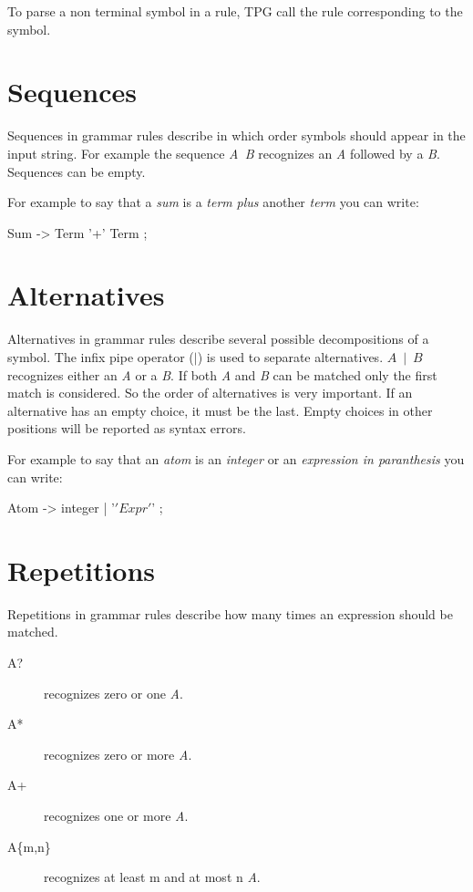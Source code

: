 To parse a non terminal symbol in a rule, TPG call the rule corresponding to the symbol.

\section{Sequences}                                             \label{parser:sequences}

Sequences in grammar rules describe in which order symbols should appear in the input string.
For example the sequence \emph{A~B} recognizes an \emph{A} followed by a \emph{B}.
Sequences can be empty.

For example to say that a \emph{sum} is a \emph{term} \emph{plus} another \emph{term} you can write:
\begin{verbatimtab}[4]
    Sum -> Term '+' Term ;
\end{verbatimtab}

\section{Alternatives}                                          \label{parser:alternatives}

Alternatives in grammar rules describe several possible decompositions of a symbol.
The infix pipe operator (\emph{$\mid$}) is used to separate alternatives.
\emph{$A~\mid~B$} recognizes either an \emph{A} or a \emph{B}.
If both \emph{A} and \emph{B} can be matched only the first match is considered.
So the order of alternatives is very important.
If an alternative has an empty choice, it must be the last.
Empty choices in other positions will be reported as syntax errors.

For example to say that an \emph{atom} is an \emph{integer} or an \emph{expression in paranthesis}
you can write:
\begin{verbatimtab}[4]
    Atom -> integer | '\(' Expr '\)' ;
\end{verbatimtab}

\section{Repetitions}                                           \label{parser:repetitions}

Repetitions in grammar rules describe how many times an expression should be matched.

\begin{description}
    \item [A?] recognizes zero or one \emph{A}.
    \item [A*] recognizes zero or more \emph{A}.
    \item [A+] recognizes one or more \emph{A}.
    \item [A\{m,n\}] recognizes at least m and at most n \emph{A}.
\end{description}

